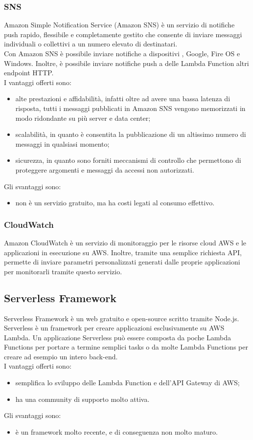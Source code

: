 \subsubsection{SNS}
Amazon Simple Notification Service (Amazon SNS) è un servizio di notifiche push rapido, flessibile e completamente gestito che consente di inviare messaggi individuali o collettivi a un numero elevato di destinatari. \\
Con Amazon SNS è possibile inviare notifiche a dispositivi , Google, Fire OS e Windows. Inoltre, è possibile inviare notifiche push a delle Lambda Function  altri endpoint HTTP. \\
I vantaggi offerti sono:
\begin{itemize}
	\item alte prestazioni e affidabilità, infatti oltre ad avere una bassa latenza di risposta, tutti i messaggi pubblicati in Amazon SNS vengono memorizzati in modo ridondante su più server e data center;
	\item scalabilità, in quanto è consentita la pubblicazione di un altissimo numero di messaggi in qualsiasi momento;
	\item sicurezza, in quanto sono forniti meccanismi di controllo che permettono di proteggere argomenti e messaggi da accessi non autorizzati.
\end{itemize}
Gli svantaggi sono:
\begin{itemize}
	\item non è un servizio gratuito, ma ha costi legati al consumo effettivo.
\end{itemize}
\subsubsection{CloudWatch}
Amazon CloudWatch è un servizio di monitoraggio per le risorse cloud AWS e le applicazioni in esecuzione su AWS. Inoltre, tramite una semplice richiesta API, permette di inviare parametri personalizzati generati dalle proprie applicazioni per monitorarli tramite questo servizio.
\subsection{Serverless Framework}
Serverless Framework è un web  gratuito e open-source scritto tramite Node.js. Serverless è un framework per creare applicazioni esclusivamente su AWS Lambda. Un applicazione Serverless può essere composta da poche Lambda Functions per portare a termine semplici tasks o da molte Lambda Functions per creare ad esempio un intero back-end.\\
I vantaggi offerti sono:
\begin{itemize}
	\item semplifica lo sviluppo delle Lambda Function e dell'API Gateway di AWS;
  \item ha una community di supporto molto attiva.
\end{itemize}
Gli svantaggi sono:
\begin{itemize}
	\item è un framework molto recente, e di conseguenza non molto maturo.
\end{itemize}
\newpage
